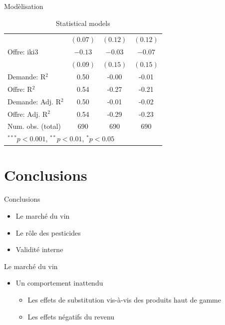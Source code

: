 \documentclass[11pt,ignorenonframetext,]{beamer}
\providecommand{\tightlist}{%
  \setlength{\itemsep}{0pt}\setlength{\parskip}{0pt}}
\begin{document}
\begin{frame}{Modèlisation}
\begin{table}[!htbp]
\begin{center}
\begin{tabular}{l c c c }
                    & $(0.07)$       & $(0.12)$       & $(0.12)$       \\
Offre: iki3         & $-0.13$        & $-0.03$        & $-0.07$        \\
                    & $(0.09)$       & $(0.15)$       & $(0.15)$       \\
\hline
Demande: R$^2$      & 0.50           & -0.00          & -0.01          \\
Offre: R$^2$        & 0.54           & -0.27          & -0.21          \\
Demande: Adj. R$^2$ & 0.50           & -0.01          & -0.02          \\
Offre: Adj. R$^2$   & 0.54           & -0.29          & -0.23          \\
Num. obs. (total)   & 690            & 690            & 690            \\
\hline
\multicolumn{4}{l}{\scriptsize{$^{***}p<0.001$, $^{**}p<0.01$, $^*p<0.05$}}
\end{tabular}
\caption{Statistical models}
\label{table : ols, 2sls et 3sls, full information clusters}
\end{center}
\end{table}

\normalsize

\end{frame}

\hypertarget{conclusions}{%
\section{Conclusions}\label{conclusions}}

\begin{frame}{Conclusions}
\protect\hypertarget{conclusions-1}{}

\begin{itemize}
\tightlist
\item
  Le marché du vin
\item
  Le rôle des pesticides\\
\item
  Validité interne
\end{itemize}

\end{frame}

\begin{frame}{Le marché du vin}
\protect\hypertarget{le-marche-du-vin}{}

\begin{itemize}
\tightlist
\item
  Un comportement inattendu

  \begin{itemize}
  \tightlist
  \item
    Les effets de substitution vis-à-vis des produits haut de gamme
  \item
    Les effets négatifs du revenu
  \end{itemize}
\end{itemize}

\end{frame}
\end{document}
